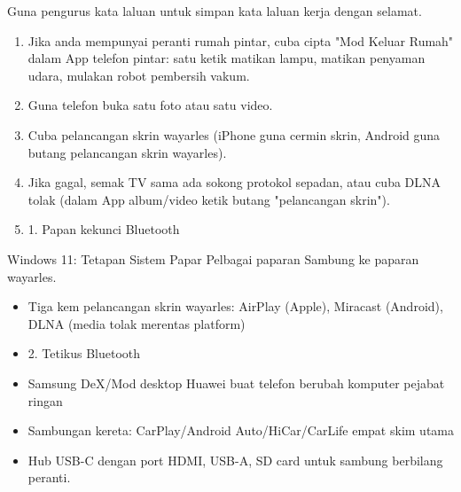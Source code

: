 \begin{tcbpractice}{Guna pengurus kata laluan untuk simpan kata laluan kerja dengan selamat.}
\begin{enumerate}
  \item Jika anda mempunyai peranti rumah pintar, cuba cipta "Mod Keluar Rumah" dalam App telefon pintar: satu ketik matikan lampu, matikan penyaman udara, mulakan robot pembersih vakum.
  \item Guna telefon buka satu foto atau satu video.
  \item Cuba pelancangan skrin wayarles (iPhone guna cermin skrin, Android guna butang pelancangan skrin wayarles).
  \item Jika gagal, semak TV sama ada sokong protokol sepadan, atau cuba DLNA tolak (dalam App album/video ketik butang "pelancangan skrin").
  \item 1. Papan kekunci Bluetooth
\end{enumerate}

\end{tcbpractice}

\begin{tcbsummary}{Windows 11: Tetapan Sistem Papar Pelbagai paparan Sambung ke paparan wayarles.}
\begin{itemize}
  \item Tiga kem pelancangan skrin wayarles: AirPlay (Apple), Miracast (Android), DLNA (media tolak merentas platform)
  \item 2. Tetikus Bluetooth
  \item Samsung DeX/Mod desktop Huawei buat telefon berubah komputer pejabat ringan
  \item Sambungan kereta: CarPlay/Android Auto/HiCar/CarLife empat skim utama
  \item Hub USB-C dengan port HDMI, USB-A, SD card untuk sambung berbilang peranti.
\end{itemize}

\end{tcbsummary}
